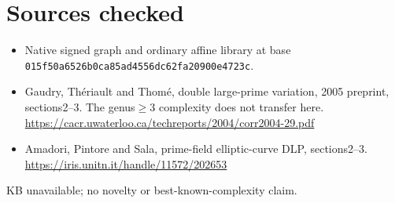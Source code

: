 \documentclass[10pt]{article}
\begin{document}
\section*{Sources checked}
\begin{itemize}
\item Native signed graph and ordinary affine library at base
\texttt{015f50a6526b0ca85ad4556dc62fa20900e4723c}.
\item Gaudry, Th\'eriault and Thom\'e, double large-prime variation, 2005
preprint, sections2--3. The genus$\geq3$ complexity does not transfer here.
\url{https://cacr.uwaterloo.ca/techreports/2004/corr2004-29.pdf}
\item Amadori, Pintore and Sala, prime-field elliptic-curve DLP, sections2--3.
\url{https://iris.unitn.it/handle/11572/202653}
\end{itemize}
KB unavailable; no novelty or best-known-complexity claim.
\end{document}

